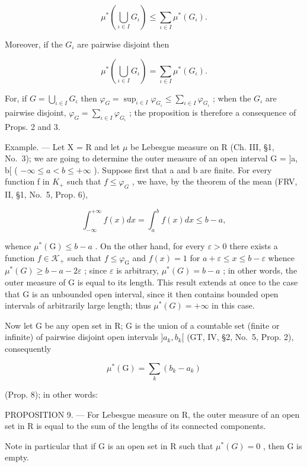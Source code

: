 \[
\mu^ {*} \left(\bigcup_ {\iota \in I} G _ {\iota}\right) \leqslant \sum_ {\iota \in I} \mu^ {*} (G _ {\iota}).\tag{6}
\]

Moreover, if the \(G_{\iota}\) are pairwise disjoint then

\[
\mu^ {*} \left(\bigcup_ {\iota \in I} G _ {\iota}\right) = \sum_ {\iota \in I} \mu^ {*} (G _ {\iota}).\tag{7}
\]

For, if \(G = \bigcup_{\iota \in I} G_{\iota}\) then \(\varphi_{G} = \sup_{\iota \in I} \varphi_{G_{\iota}} \leqslant \sum_{\iota \in I} \varphi_{G_{\iota}}\) ; when the \(G_{\iota}\) are pairwise disjoint, \(\varphi_{G} = \sum_{\iota \in I} \varphi_{G_{\iota}}\) ; the proposition is therefore a consequence of Props. 2 and 3.

Example. --- Let X = R and let \(\mu\) be Lebesgue measure on R (Ch. III, §1, No.~3); we are going to determine the outer measure of an open interval G = {]}a, b{[} ( \(-\infty \leqslant a < b \leqslant +\infty\) ). Suppose first that a and b are finite. For every function f in \(K_{+}\) such that \(f \leqslant \varphi_{G}\) , we have, by the theorem of the mean (FRV, II, §1, No.~5, Prop. 6),

\[
\int_ {- \infty} ^ {+ \infty} f (x) d x = \int_ {a} ^ {b} f (x) d x \leqslant b - a,
\]

whence \(\mu^{*}(\mathrm{G})\leqslant b - a\) . On the other hand, for every \(\varepsilon >0\) there exists a function \(f\in \mathcal{K}_{+}\) such that \(f\leqslant \varphi_{\mathrm{G}}\) and \(f(x) = 1\) for \(a + \varepsilon \leqslant x\leqslant b - \varepsilon\) whence \(\mu^{*}(G) \geqslant b - a - 2\varepsilon\) ; since \(\varepsilon\) is arbitrary, \(\mu^{*}(G) = b - a\) ; in other words, the outer measure of G is equal to its length. This result extends at once to the case that G is an unbounded open interval, since it then contains bounded open intervals of arbitrarily large length; thus \(\mu^{*}(G) = +\infty\) in this case.

Now let G be any open set in R; G is the union of a countable set (finite or infinite) of pairwise disjoint open intervals \({]}a_{k}, b_{k}{[}\) (GT, IV, §2, No.~5, Prop. 2), consequently

\[
\mu^ {*} (\mathrm{G}) = \sum_ {k} (b _ {k} - a _ {k})
\]

(Prop. 8); in other words:

PROPOSITION 9. --- For Lebesgue measure on R, the outer measure of an open set in R is equal to the sum of the lengths of its connected components.

Note in particular that if G is an open set in R such that \(\mu^{*}(G)=0\) , then G is empty.

